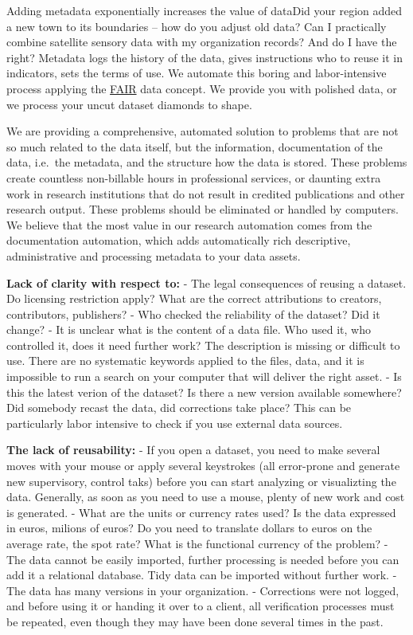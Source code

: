 \documentclass[
  a4paper,
  openany, a4paper, oneside]{book}
\begin{document}
Adding metadata exponentially increases the value of dataDid your region added a new town to its boundaries -- how do you adjust old data? Can I practically combine satellite sensory data with my organization records? And do I have the right? Metadata logs the history of the data, gives instructions who to reuse it in indicators, sets the terms of use. We automate this boring and labor-intensive process applying the \href{https://contributors.dataobservatory.eu/FAIR-data.html\#FAIR}{FAIR} data concept. We provide you with polished data, or we process your uncut dataset diamonds to shape.

We are providing a comprehensive, automated solution to problems that are not so much related to the data itself, but the information, documentation of the data, i.e.~the metadata, and the structure how the data is stored. These problems create countless non-billable hours in professional services, or daunting extra work in research institutions that do not result in credited publications and other research output. These problems should be eliminated or handled by computers. We believe that the most value in our research automation comes from the documentation automation, which adds automatically rich descriptive, administrative and processing metadata to your data assets.

\textbf{Lack of clarity with respect to:}
- The legal consequences of reusing a dataset. Do licensing restriction apply? What are the correct attributions to creators, contributors, publishers?
- Who checked the reliability of the dataset? Did it change?
- It is unclear what is the content of a data file. Who used it, who controlled it, does it need further work? The description is missing or difficult to use. There are no systematic keywords applied to the files, data, and it is impossible to run a search on your computer that will deliver the right asset.
- Is this the latest verion of the dataset? Is there a new version available somewhere? Did somebody recast the data, did corrections take place? This can be particularly labor intensive to check if you use external data sources.

\textbf{The lack of reusability:}
- If you open a dataset, you need to make several moves with your mouse or apply several keystrokes (all error-prone and generate new supervisory, control taks) before you can start analyzing or visualizting the data. Generally, as soon as you need to use a mouse, plenty of new work and cost is generated.
- What are the units or currency rates used? Is the data expressed in euros, milions of euros? Do you need to translate dollars to euros on the average rate, the spot rate? What is the functional currency of the problem?
- The data cannot be easily imported, further processing is needed before you can add it a relational database. Tidy data can be imported without further work.
- The data has many versions in your organization.
- Corrections were not logged, and before using it or handing it over to a client, all verification processes must be repeated, even though they may have been done several times in the past.
\end{document}
